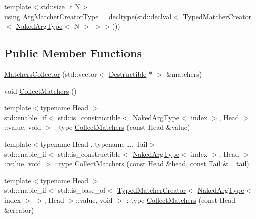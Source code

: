 \begin{DoxyCompactItemize}
\item 
{\footnotesize template$<$std\+::size\+\_\+t N$>$ }\\using \mbox{\hyperlink{classfakeit_1_1MatchersCollector_a1b9d32a66882e0559e7072f1db88eee3}{Arg\+Matcher\+Creator\+Type}} = decltype(std\+::declval$<$ \mbox{\hyperlink{structfakeit_1_1TypedMatcherCreator}{Typed\+Matcher\+Creator}}$<$ \mbox{\hyperlink{classfakeit_1_1MatchersCollector_aeda8ced6a2f0cb7c6e4f916f18a91730}{Naked\+Arg\+Type}}$<$ N $>$ $>$$>$())
\end{DoxyCompactItemize}
\subsection*{Public Member Functions}
\begin{DoxyCompactItemize}
\item 
\mbox{\hyperlink{classfakeit_1_1MatchersCollector_ac5e0254e23626d189f329de8051137a6}{Matchers\+Collector}} (std\+::vector$<$ \mbox{\hyperlink{classfakeit_1_1Destructible}{Destructible}} $\ast$ $>$ \&matchers)
\item 
void \mbox{\hyperlink{classfakeit_1_1MatchersCollector_a2d9a08a347c3915daa33f307a274f13c}{Collect\+Matchers}} ()
\item 
{\footnotesize template$<$typename Head $>$ }\\std\+::enable\+\_\+if$<$ std\+::is\+\_\+constructible$<$ \mbox{\hyperlink{classfakeit_1_1MatchersCollector_aeda8ced6a2f0cb7c6e4f916f18a91730}{Naked\+Arg\+Type}}$<$ index $>$, Head $>$\+::value, void $>$ \+::type \mbox{\hyperlink{classfakeit_1_1MatchersCollector_a506da335b6062998e24371fcd3f9b7b5}{Collect\+Matchers}} (const Head \&value)
\item 
{\footnotesize template$<$typename Head , typename ... Tail$>$ }\\std\+::enable\+\_\+if$<$ std\+::is\+\_\+constructible$<$ \mbox{\hyperlink{classfakeit_1_1MatchersCollector_aeda8ced6a2f0cb7c6e4f916f18a91730}{Naked\+Arg\+Type}}$<$ index $>$, Head $>$\+::value, void $>$ \+::type \mbox{\hyperlink{classfakeit_1_1MatchersCollector_ab7d1bf17a18f483ebc763f5d6793392d}{Collect\+Matchers}} (const Head \&head, const Tail \&... tail)
\item 
{\footnotesize template$<$typename Head $>$ }\\std\+::enable\+\_\+if$<$ std\+::is\+\_\+base\+\_\+of$<$ \mbox{\hyperlink{structfakeit_1_1TypedMatcherCreator}{Typed\+Matcher\+Creator}}$<$ \mbox{\hyperlink{classfakeit_1_1MatchersCollector_aeda8ced6a2f0cb7c6e4f916f18a91730}{Naked\+Arg\+Type}}$<$ index $>$ $>$, Head $>$\+::value, void $>$ \+::type \mbox{\hyperlink{classfakeit_1_1MatchersCollector_a5aeb02196cff5f440c51a933d9bffe88}{Collect\+Matchers}} (const Head \&creator)

\end{DoxyCompactItemize}
